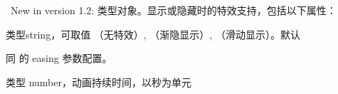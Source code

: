 \documentclass[letterpaper,10pt,english]{sphinxmanual}
\begin{document}

\begin{fulllineitems}
\label{api/component/overlay/overlay:Overlay.effect}~New in version 1.2: 类型对象。显示或隐藏时的特效支持，包括以下属性：

\begin{fulllineitems}
类型string，可取值  （无特效）,  （渐隐显示）,  （滑动显示）。默认 

\end{fulllineitems}



\begin{fulllineitems}
\label{api/component/overlay/overlay:Overlay.easing}
同 {\hyperref[api/core/anim/index:Anim.Anim]{}} 的 easing 参数配置。

\end{fulllineitems}



\begin{fulllineitems}
\label{api/component/overlay/overlay:Overlay.duration}
类型 number，动画持续时间，以秒为单元

\end{fulllineitems}


\end{fulllineitems}


\end{document}
